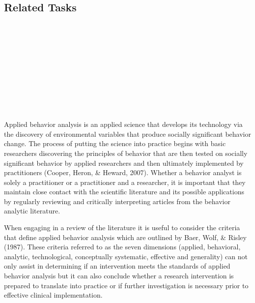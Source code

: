 \subsection{Related Tasks}
\fourbFour{}\\
\fourbFive{}\\
\fourbSix{}\\
\fourbSeven{}\\
\fourbNine{}\\
\fourbEleven{}\\
\fourhFour{}\\
\fouriOne{}\\
%
%
%
%
%
\section[\fourbTwo{}]{\fourbTwo{}%
              }
Applied behavior analysis is an applied science that develops its technology via the discovery of environmental variables that produce socially significant behavior change. The process of putting the science into practice begins with basic researchers discovering the principles of behavior that are then tested on socially significant behavior by applied researchers and then ultimately implemented by practitioners (Cooper, Heron, \& Heward, 2007). Whether a behavior analyst is solely a practitioner or a practitioner and a researcher, it is important that they maintain close contact with the scientific literature and its possible applications by regularly reviewing and critically interpreting articles from the behavior analytic literature.

When engaging in a review of the literature it is useful to consider the criteria that define applied behavior analysis which are outlined by Baer, Wolf, \& Risley (1987). These criteria referred to as the seven dimensions (applied, behavioral, analytic, technological, conceptually systematic, effective and generality) can not only assist in determining if an intervention  meets the standards of applied behavior analysis but it can also conclude whether a research intervention is prepared to translate into  practice or if further investigation is necessary prior to  effective clinical implementation.

